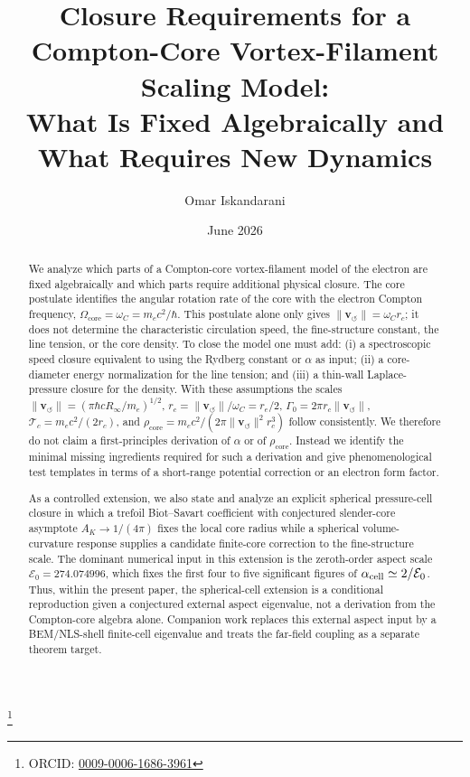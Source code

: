\documentclass[aps,pra,preprint,longbibliography,nofootinbib]{revtex4-2}
\newcommand{\Et}{\mathcal{E}_0}                    %
\newcommand{\AK}{A_K}                                %
\begin{document}
\title{Closure Requirements for a Compton-Core Vortex-Filament Scaling Model:\\
       What Is Fixed Algebraically and What Requires New Dynamics}

\author{Omar Iskandarani}
\thanks{ORCID: \href{https://orcid.org/0009-0006-1686-3961}{0009-0006-1686-3961}}
\date{June 2026}


\begin{abstract}
We analyze which parts of a Compton-core vortex-filament model of the
electron are fixed algebraically and which parts require additional
physical closure.  The core postulate identifies the angular rotation
rate of the core with the electron Compton frequency,
$\Omega_{\mathrm{core}}=\omega_C=m_e c^2/\hbar$.  This postulate alone
only gives $\lVert \mathbf{v}_{\!\boldsymbol{\circlearrowleft}}\rVert=\omega_C r_c$;
it does not determine the characteristic circulation speed, the
fine-structure constant, the line tension, or the core density.  To close
the model one must add: (i) a spectroscopic speed closure equivalent to
using the Rydberg constant or $\alpha$ as input; (ii) a core-diameter
energy normalization for the line tension; and (iii) a thin-wall
Laplace-pressure closure for the density.  With these assumptions the
scales
$\lVert \mathbf{v}_{\!\boldsymbol{\circlearrowleft}}\rVert=(\pi\hbar cR_\infty/m_e)^{1/2}$,
$r_c=\lVert \mathbf{v}_{\!\boldsymbol{\circlearrowleft}}\rVert/\omega_C=r_e/2$,
$\Gamma_0=2\pi r_c\lVert \mathbf{v}_{\!\boldsymbol{\circlearrowleft}}\rVert$,
$\mathcal{T}_c=m_ec^2/(2r_c)$, and
$\rho_{\mathrm{core}}=m_ec^2/(2\pi\lVert \mathbf{v}_{\!\boldsymbol{\circlearrowleft}}\rVert^2r_c^3)$
follow consistently.  We therefore do not claim a first-principles
derivation of $\alpha$ or of $\rho_{\mathrm{core}}$.  Instead we identify
the minimal missing ingredients required for such a derivation and give
phenomenological test templates in terms of a short-range potential
correction or an electron form factor.

As a controlled extension, we also state and analyze an explicit spherical
pressure-cell closure in which a trefoil Biot--Savart coefficient with
conjectured slender-core asymptote $\AK\to1/(4\pi)$ fixes the local core
radius while a spherical volume-curvature response supplies a candidate
finite-core correction to the fine-structure scale.  The dominant numerical
input in this extension is the zeroth-order aspect scale
$\Et=274.074996$, which fixes the first four to five significant figures of
$\alpha_{\rm cell}\simeq2/\Et$.  Thus, within the present paper, the spherical-cell extension is a
conditional reproduction given a conjectured external aspect eigenvalue,
not a derivation from the Compton-core algebra alone.  Companion work replaces
this external aspect input by a BEM/NLS-shell finite-cell eigenvalue and treats
the far-field coupling as a separate theorem target.

\end{abstract}
\end{document}
